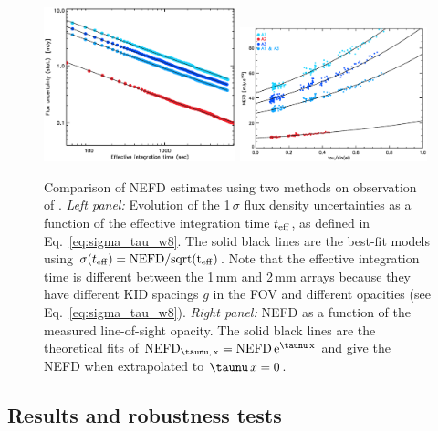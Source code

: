 \begin{figure}[!thbp]
  \begin{center}
    \includegraphics[trim={0.5cm, 0, 0, 0.5cm}, clip, angle=0, width=0.495\textwidth]{Figures/hls_nefd_vst.eps}
    \includegraphics[trim={0.5cm, 0, 0.2cm, 0.5cm}, clip, angle=0, width=0.485\textwidth]{Figures/hls_NEFD_vs_TauElev_all.eps}
    \caption{Comparison of NEFD estimates using two methods on observation of
      \hls. \emph{Left panel:} Evolution of the 1\,$\sigma$ flux density
      uncertainties as a function of the effective integration time
      $t_{\rm{eff}}$, as defined in Eq.~\ref{eq:sigma_tau_w8}. The solid black
      lines are the best-fit models using $\sigma(t_{\rm{eff}}) =
      \rm{NEFD}/sqrt(t_{\rm{eff}})$. Note that the effective integration time
      is different between the 1\,mm and 2\,mm arrays because they have
      different KID spacings $g$ in the FOV and different opacities (see
      Eq.~\ref{eq:sigma_tau_w8}). \emph{Right panel:} NEFD as a function of the
    measured line-of-sight opacity. The solid black lines are the theoretical
    fits of $\rm{NEFD}_{\taunu,\, x } = \rm{NEFD}\, e^{\taunu\,x}$ and give the
    NEFD when extrapolated to $\taunu\,x = 0$. }
    \label{fig:nefd_twomethods}
  \end{center}
\end{figure}

\subsection{Results and robustness tests}
\label{se:nefd_results}

